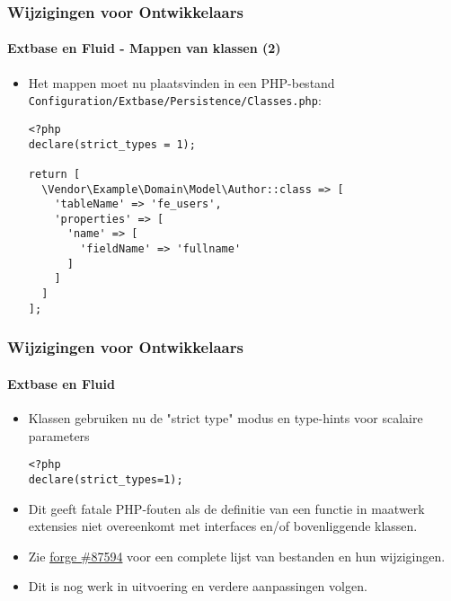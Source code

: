 
\begin{frame}[fragile]
	\frametitle{Wijzigingen voor Ontwikkelaars}
	\framesubtitle{Extbase en Fluid - Mappen van klassen (2)}

	\lstset{basicstyle=\tiny\ttfamily}

	\begin{itemize}
		\item Het mappen moet nu plaatsvinden in een PHP-bestand \texttt{Configuration/Extbase/Persistence/Classes.php}:

\begin{lstlisting}
<?php
declare(strict_types = 1);

return [
  \Vendor\Example\Domain\Model\Author::class => [
    'tableName' => 'fe_users',
    'properties' => [
      'name' => [
        'fieldName' => 'fullname'
      ]
    ]
  ]
];
\end{lstlisting}

	\end{itemize}

\end{frame}


\begin{frame}[fragile]
	\frametitle{Wijzigingen voor Ontwikkelaars}
	\framesubtitle{Extbase en Fluid}

	\lstset{basicstyle=\smaller\ttfamily}

	\begin{itemize}
		\item Klassen gebruiken nu de "strict type" modus en type-hints voor scalaire parameters

\begin{lstlisting}
<?php
declare(strict_types=1);
\end{lstlisting}

		\item Dit geeft fatale PHP-fouten als de definitie van een functie in maatwerk
			extensies niet overeenkomt met interfaces en/of bovenliggende klassen.

		\item Zie \href{https://forge.typo3.org/issues/87594}{forge \#87594}
			voor een complete lijst van bestanden en hun wijzigingen.

		\item Dit is nog werk in uitvoering en verdere aanpassingen volgen.

	\end{itemize}

\end{frame}

